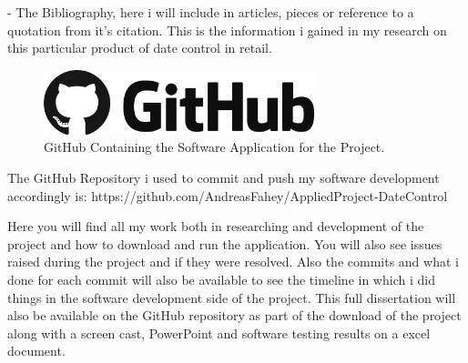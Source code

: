 - The Bibliography, here i will include in articles, pieces or reference to a quotation from it's citation. This is the information i gained in my research on this particular product of date control in retail. 
\newpage

\begin{figure}[h!]
	\caption{GitHub Containing the Software Application for the Project.}
	\label{image:github}
	\centering
	\includegraphics[width=0.7\textwidth]{images/github.png}
\end{figure}

The GitHub Repository i used to commit and push my software development accordingly is: https://github.com/AndreasFahey/AppliedProject-DateControl
\newline

Here you will find all my work both in researching and development of the project and how to download and run the application. You will also see issues raised during the project and if they were resolved. Also the commits and what i done for each commit will also be available to see the timeline in which i did things in the software development side of the project. This full dissertation will also be available on the GitHub repository as part of the download of the project along with a screen cast, PowerPoint and software testing results on a excel document.



